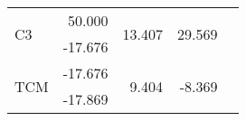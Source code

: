 \begin{table}[H]
{\begin{tabular}{|l|r|r|r|l}
\cline{1-4}
\multirow{2}{*}{C3}                                                  & 50.000                                                                                                                                                                               & \multirow{2}{*}{13.407}                                                                                                                                                                           & \multirow{2}{*}{29.569}                                                                                                                                                                            & \multirow{2}{*}{}  \\
                                                                     & -17.676                                                                                                                                                                              &                                                                                                                                                                                                   &                                                                                                                                                                                                    &                    \\ 
\cline{1-4}
\multirow{2}{*}{TCM}                                                 & -17.676                                                                                                                                                                              & \multirow{2}{*}{9.404}                                                                                                                                                                            & \multirow{2}{*}{-8.369}                                                                                                                                                                            & \multirow{2}{*}{}  \\
                                                                     & -17.869                                                                                                                                                                              &                                                                                                                                                                                                   &                                                                                                                                                                                                    &                    \\ 

\end{tabular}}
\end{table}
